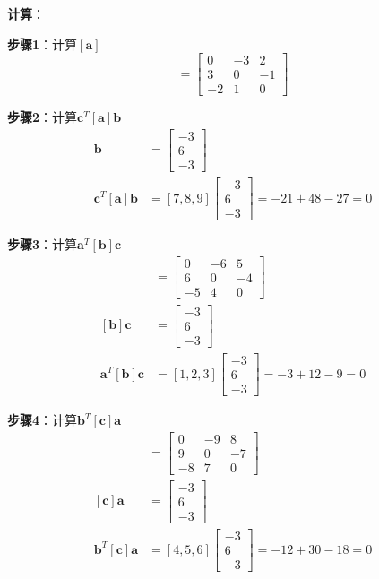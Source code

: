 \documentclass[12pt,a4paper]{article}
\begin{document}
\textbf{计算}：

\textbf{步骤1}：计算$[\bm{a}]$
\begin{equation}
[\bm{a}] = \begin{bmatrix}
0 & -3 & 2 \\
3 & 0 & -1 \\
-2 & 1 & 0
\end{bmatrix}
\end{equation}

\textbf{步骤2}：计算$\bm{c}^T [\bm{a}] \bm{b}$
\begin{align}
[\bm{a}] \bm{b} &= \begin{bmatrix} -3 \\ 6 \\ -3 \end{bmatrix} \\
\bm{c}^T [\bm{a}] \bm{b} &= [7, 8, 9] \begin{bmatrix} -3 \\ 6 \\ -3 \end{bmatrix} = -21 + 48 - 27 = 0
\end{align}

\textbf{步骤3}：计算$\bm{a}^T [\bm{b}] \bm{c}$
\begin{align}
[\bm{b}] &= \begin{bmatrix}
0 & -6 & 5 \\
6 & 0 & -4 \\
-5 & 4 & 0
\end{bmatrix} \\
[\bm{b}] \bm{c} &= \begin{bmatrix} -3 \\ 6 \\ -3 \end{bmatrix} \\
\bm{a}^T [\bm{b}] \bm{c} &= [1, 2, 3] \begin{bmatrix} -3 \\ 6 \\ -3 \end{bmatrix} = -3 + 12 - 9 = 0
\end{align}

\textbf{步骤4}：计算$\bm{b}^T [\bm{c}] \bm{a}$
\begin{align}
[\bm{c}] &= \begin{bmatrix}
0 & -9 & 8 \\
9 & 0 & -7 \\
-8 & 7 & 0
\end{bmatrix} \\
[\bm{c}] \bm{a} &= \begin{bmatrix} -3 \\ 6 \\ -3 \end{bmatrix} \\
\bm{b}^T [\bm{c}] \bm{a} &= [4, 5, 6] \begin{bmatrix} -3 \\ 6 \\ -3 \end{bmatrix} = -12 + 30 - 18 = 0
\end{align}
\end{document}
